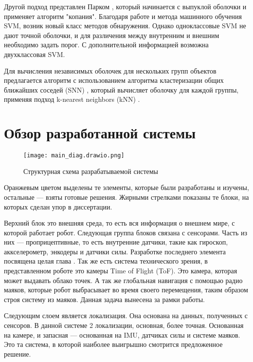Другой подход представлен Парком \cite{parkNewConcaveHull2012}, который начинается с выпуклой оболочки и применяет алгоритм "копания". Благодаря работе \cite{j.a.leonardUsingRadialBasis1992} и  метода машинного обучения  SVM, возник новый класс методов обнаружения. Однако одноклассовые SVM не дают точной оболочки, и для различения между внутренним и внешним необходимо задать порог. С дополнительной информацией возможна двухклассовая SVM. 

Для вычисления независимых оболочек для нескольких групп объектов предлагается алгоритм с использованием алгоритма кластеризации общих ближайших соседей (SNN) , который вычисляет оболочку для каждой группы, применяя подход k-nearest neighbors (kNN) \cite{moreiraConcaveHullKnearest2007,ertozNewSharedNearest2002,chauBorderSamplesDetection2011,xiaBORDEREfficientComputation2006}.

\section{Обзор разработанной системы}
\begin{figure}[H]
    \centering\texttt{[image: main\_diag.drawio.png]}
    \caption{Структурная схема разрабатываемой системы}
    \label{fig:diag_system.png}
\end{figure}

Оранжевым цветом выделены те элементы, которые были разработаны и изучены, остальные --- взяты готовые решения. Жирными стрелками показаны те блоки, на которых сделан упор в диссертации.

Верхний блок это внешняя среда, то есть вся информация о внешнем мире, с которой работает робот. Следующая группа блоков связана с сенсорами. Часть из них --- проприцептивные, то есть внутренние датчики, такие как гироскоп, аккселерометр, энкодеры и датчики силы. Разработке последнего элемента посвящена целая глава . Так же есть система технического зрения, в представленном роботе это камеры Time of Flight (ToF). Это камера, которая может выдавать облако точек. А так же глобальная навигация с помощью радио маяков, которые робот выбрасывает во время своего перемещения, таким образом строя систему из маяков. Данная задача вынесена за рамки работы.

Следующим слоем является локализация. Она основана на данных, полученных с сенсоров. В данной системе 2 локализации, основная, более точная. Основанная на камере, и запасная --- основанная на IMU, датчиках силы и системе маяков. Это та система, в которой наиболее выигрышно смотрится предложенное решение.

